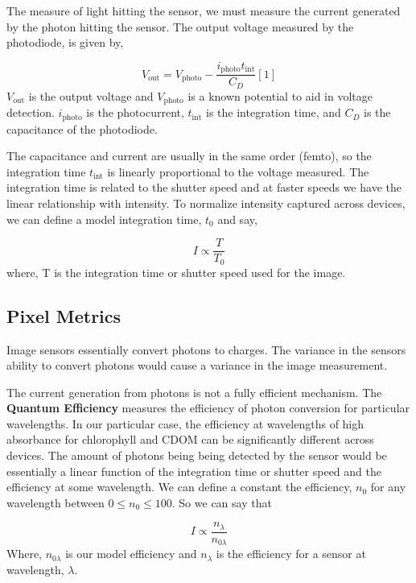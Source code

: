 \documentclass{article}
\begin{document}
The measure of light hitting the sensor, we must measure the current generated
by the photon hitting the sensor. The output voltage measured by the photodiode,
is given by,

\begin{equation}
  V_{\text{out}} = V_{\text{photo}} - \frac{i_{\text{photo}}t_{\text{int}}}{C_{D}}[1]
\end{equation}
$V_{\text{out}}$ is the output voltage and $V_{\text{photo}} $ is a known
potential to aid in voltage detection.
$ i_{\text{photo}}$ is the photocurrent, $t_{\text{int}}$ is the integration time,
and $C_D $ is the capacitance of the photodiode.

The capacitance and current are usually in the same order (femto), so the integration
time $ t_{\text{int}}$ is linearly proportional to the voltage measured. The integration
time is related to the shutter speed and at faster speeds we have the linear relationship
with intensity. To normalize intensity captured across devices, we can define a model
integration time, $ t_0$ and say,

\begin{equation}
  I \propto \frac{T}{T_0}
\end{equation}
where, T is the integration time or shutter speed used for the image.

\subsection{Pixel Metrics}
Image sensors essentially convert photons to charges. The variance in the
sensors ability to convert photons would cause a variance in the image measurement.

The current generation from photons is not a fully efficient mechanism.
The \textbf{Quantum Efficiency} measures the efficiency of photon conversion
for particular wavelengths. In our particular case, the efficiency at wavelengths
of high absorbance for chlorophyll and CDOM can be significantly different across
devices. The amount of photons being being detected by the sensor would be essentially a
linear function of the integration time or shutter speed and the efficiency at some
wavelength. We can define a constant the efficiency, $ n_0$ for any wavelength between
$ 0 \leq n_0 \leq 100$. So we can say that

\begin{equation}
  I \propto \frac{n_{\lambda}}{n_{0\lambda}}
\end{equation}
Where, $ n_{0\lambda}$ is our model efficiency and $n_{\lambda}$
is the efficiency for a sensor at wavelength, $ \lambda$.
\end{document}
